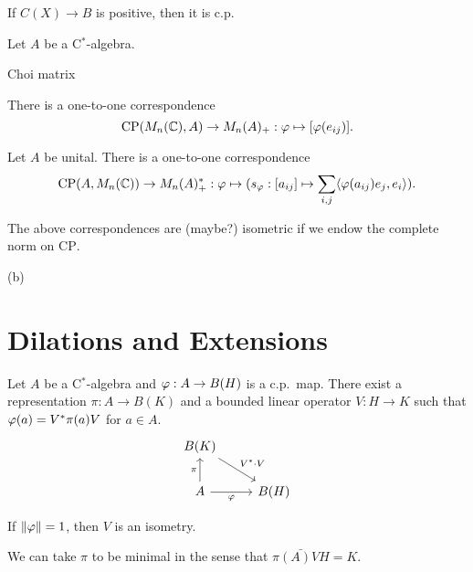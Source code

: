 \documentclass{../../large}
\begin{document}
\begin{prb}
If $C(X)\to B$ is positive, then it is c.p.
\end{prb}


\begin{prb}
Let $A$ be a C$^*$-algebra.
\begin{parts}
\item Choi matrix
\item
There is a one-to-one correspondence
\[\mathrm{CP}(M_n(\mathbb{C}),A)\to M_n(A)_+:\varphi\mapsto[\varphi(e_{ij})].\]
\item
Let $A$ be unital.
There is a one-to-one correspondence
\[\mathrm{CP}(A,M_n(\mathbb{C}))\to M_n(A)^*_+:\varphi\mapsto(s_\varphi:[a_{ij}]\mapsto\sum_{i,j}\langle\varphi(a_{ij})e_j,e_i\rangle).\]
\item The above correspondences are (maybe?) isometric if we endow the complete norm on $\mathrm{CP}$.
\end{parts}
\end{prb}
\begin{pf}
(b)


\end{pf}

\section{Dilations and Extensions}

\begin{prb}
Let $A$ be a C$^*$-algebra and $\varphi:A\to B(H)$ is a c.p.~map.
There exist a representation $\pi:A\to B(K)$ and a bounded linear operator $V:H\to K$ such that $\varphi(a)=V^*\pi(a)V$ for $a\in A$.
\[\begin{tikzcd}
B(K) \ar{dr}{V^*\cdot V} &\\
A \ar[swap]{r}{\f} \ar{u}{\pi} & B(H)
\end{tikzcd}\]
\begin{parts}
\item If $\|\varphi\|=1$, then $V$ is an isometry.
\item 
\item We can take $\pi$ to be minimal in the sense that $\bar{\pi(A)VH}=K$.
\end{parts}
\end{prb}
\begin{pf}

\end{pf}
\end{document}
